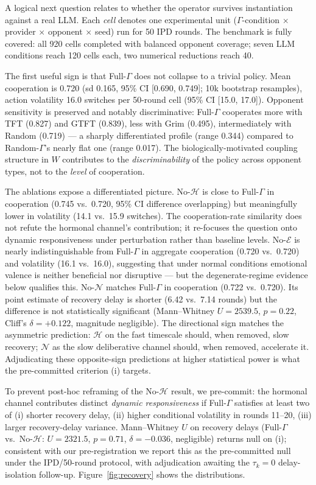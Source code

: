 \documentclass{article}
\begin{document}
A logical next question relates to whether the operator survives instantiation against a real LLM. Each \emph{cell} denotes one experimental unit (\mbox{$\Gamma$-condition} $\times$ provider $\times$ opponent $\times$ seed) run for 50 IPD rounds. The benchmark is fully covered: all 920 cells completed with balanced opponent coverage; seven LLM conditions reach 120 cells each, two numerical reductions reach 40.

The first useful sign is that Full-$\Gamma$ does not collapse to a trivial policy. Mean cooperation is 0.720 (sd 0.165, 95\% CI [0.690, 0.749]; 10k bootstrap resamples), action volatility 16.0 switches per 50-round cell (95\% CI [15.0, 17.0]). Opponent sensitivity is preserved and notably discriminative: Full-$\Gamma$ cooperates more with TFT (0.827) and GTFT (0.839), less with Grim (0.495), intermediately with Random (0.719) --- a sharply differentiated profile (range 0.344) compared to Random-$\Gamma$'s nearly flat one (range 0.017). The biologically-motivated coupling structure in $W$ contributes to the \textit{discriminability} of the policy across opponent types, not to the \textit{level} of cooperation.

The ablations expose a differentiated picture. No-$\mathcal{H}$ is close to Full-$\Gamma$ in cooperation (0.745 vs.\ 0.720, 95\% CI difference overlapping) but meaningfully lower in volatility (14.1 vs.\ 15.9 switches). The cooperation-rate similarity does not refute the hormonal channel's contribution; it re-focuses the question onto dynamic responsiveness under perturbation rather than baseline levels. No-$\mathcal{E}$ is nearly indistinguishable from Full-$\Gamma$ in aggregate cooperation (0.720 vs.\ 0.720) and volatility (16.1 vs.\ 16.0), suggesting that under normal conditions emotional valence is neither beneficial nor disruptive --- but the degenerate-regime evidence below qualifies this. No-$\mathcal{N}$ matches Full-$\Gamma$ in cooperation (0.722 vs.\ 0.720). Its point estimate of recovery delay is shorter (6.42 vs.\ 7.14 rounds) but the difference is not statistically significant (Mann--Whitney $U{=}2539.5$, $p{=}0.22$, Cliff's $\delta{=}+0.122$, magnitude negligible). The directional sign matches the asymmetric prediction: $\mathcal{H}$ on the fast timescale should, when removed, slow recovery; $\mathcal{N}$ as the slow deliberative channel should, when removed, accelerate it. Adjudicating these opposite-sign predictions at higher statistical power is what the pre-committed criterion (i) targets.

To prevent post-hoc reframing of the No-$\mathcal{H}$ result, we pre-commit: the hormonal channel contributes distinct \emph{dynamic responsiveness} if Full-$\Gamma$ satisfies at least two of (i) shorter recovery delay, (ii) higher conditional volatility in rounds 11--20, (iii) larger recovery-delay variance. Mann--Whitney $U$ on recovery delays (Full-$\Gamma$ vs.\ No-$\mathcal{H}$: $U{=}2321.5$, $p{=}0.71$, $\delta{=}-0.036$, negligible) returns null on (i); consistent with our pre-registration we report this as the pre-committed null under the IPD/50-round protocol, with adjudication awaiting the $\tau_k{=}0$ delay-isolation follow-up. Figure~\ref{fig:recovery} shows the distributions.
\end{document}
